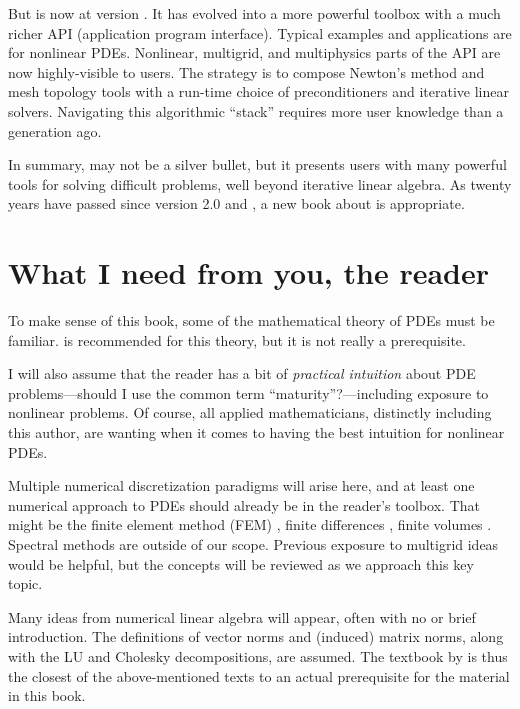 But \PETSc is now at version \PETSCVERSION.  It has evolved into a more powerful toolbox with a much richer API (application program interface).  Typical examples and applications are for nonlinear PDEs.  Nonlinear, multigrid, and multiphysics parts of the API are now highly-visible to users.  The \PETSc strategy is to compose Newton's method and mesh topology tools with a run-time choice of preconditioners and iterative linear solvers.  Navigating this algorithmic ``stack'' requires more user knowledge than a generation ago.

In summary, \PETSc may not be a silver bullet, but it presents users with many powerful tools for solving difficult problems, well beyond iterative linear algebra.  As twenty years have passed since version 2.0 and \citet{Smithetal1996}, a new book about \PETSc is appropriate.


\section{What I need from you, the reader}

To make sense of this book, some of the mathematical theory of PDEs must be familiar.  \citet{Evans2010} is recommended for this theory, but it is not really a prerequisite.

I will also assume that the reader has a bit of \emph{practical intuition} about PDE problems---should I use the common term ``maturity''?---including exposure to nonlinear problems.  Of course, all applied mathematicians, distinctly including this author, are wanting when it comes to having the best intuition for nonlinear PDEs.

Multiple numerical discretization paradigms will arise here, and at least one numerical approach to PDEs should already be in the reader's toolbox.  That might be the finite element method (FEM) \citep{Braess2007,Elmanetal2005,KarniadakisSherwin2013}, finite differences \citep{MortonMayers2005}, finite volumes \citep{LeVeque2002}.  Spectral methods \citep{Trefethen2000} are outside of our scope.  Previous exposure to multigrid ideas \citep{Briggsetal2000} would be helpful, but the concepts will be reviewed as we approach this key topic.

Many ideas from numerical linear algebra \citep{Greenbaum1997,TrefethenBau1997} will appear, often with no or brief introduction.  The definitions of vector norms and (induced) matrix norms, along with the LU and Cholesky decompositions, are assumed.  The textbook by \citet{TrefethenBau1997} is thus the closest of the above-mentioned texts to an actual prerequisite for the material in this book.

